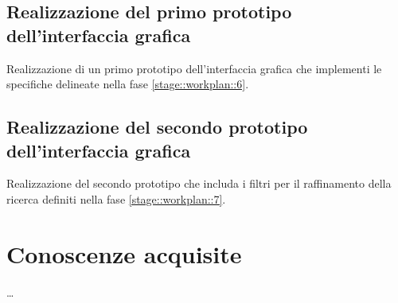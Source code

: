 \documentclass[10pt,a4paper,hidelinks]{scrartcl} %
\begin{document}
	\subsection{Realizzazione del primo prototipo dell'interfaccia grafica}
	\label{stage::workplan::10}
	Realizzazione di un primo prototipo dell'interfaccia grafica che implementi le specifiche delineate nella fase \ref{stage::workplan::6}.

	\subsection{Realizzazione del secondo prototipo dell'interfaccia grafica}
	\label{stage::workplan::11}
	Realizzazione del secondo prototipo che includa i filtri per il raffinamento della ricerca definiti nella fase \ref{stage::workplan::7}.
	
	\section{Conoscenze acquisite}
	\ldots %
\end{document}
